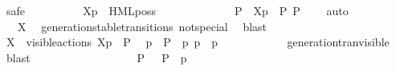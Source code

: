 \begin{isabellebody}
\ {\isacharparenleft}{\kern0pt}safe{\isacharparenright}{\kern0pt}\isanewline
\ \ \ \ \ \ \ \ \isamarkupfalse%
\ {\isacartoucheopen}{\isasymtheta}{\isacharbrackleft}{\kern0pt}X{\isacharbrackright}{\kern0pt}{\isacharparenleft}{\kern0pt}p{\isacharparenright}{\kern0pt}\ {\isasymTurnstile}\ HML{\isacharunderscore}{\kern0pt}poss\ {\isasymalpha}\ {\isasymsigma}{\isacharparenleft}{\kern0pt}{\isasymphi}{\isacharparenright}{\kern0pt}{\isacartoucheclose}\isanewline
\ \ \ \ \ \ \ \ \isamarkupfalse%
\ \isamarkupfalse%
\ P{\isacharprime}{\kern0pt}\ \ {\isacartoucheopen}{\isasymtheta}{\isacharbrackleft}{\kern0pt}X{\isacharbrackright}{\kern0pt}{\isacharparenleft}{\kern0pt}p{\isacharparenright}{\kern0pt}\ {\isasymlongmapsto}\isactrlsup {\isasymtheta}{\isasymalpha}\ P{\isacharprime}{\kern0pt}{\isacartoucheclose}\ {\isacartoucheopen}P{\isacharprime}{\kern0pt}\ {\isasymTurnstile}\ {\isasymsigma}{\isacharparenleft}{\kern0pt}{\isasymphi}{\isacharparenright}{\kern0pt}{\isacartoucheclose}\ \isamarkupfalse%
\ auto\isanewline
\ \ \ \ \ \ \ \ \isamarkupfalse%
\ {\isacartoucheopen}{\isasymalpha}\ {\isasymin}\ X{\isacartoucheclose}\ \isamarkupfalse%
\ generation{\isacharunderscore}{\kern0pt}stable{\isacharunderscore}{\kern0pt}transitions\ {\isasymalpha}{\isacharunderscore}{\kern0pt}not{\isacharunderscore}{\kern0pt}special\ \isamarkupfalse%
\ blast\isanewline
\ \ \ \ \ \ \ \ \isamarkupfalse%
\ {\isacartoucheopen}X\ {\isasymsubseteq}\ visible{\isacharunderscore}{\kern0pt}actions{\isacartoucheclose}\ {\isacartoucheopen}{\isasymtheta}{\isacharbrackleft}{\kern0pt}X{\isacharbrackright}{\kern0pt}{\isacharparenleft}{\kern0pt}p{\isacharparenright}{\kern0pt}\ {\isasymlongmapsto}\isactrlsup {\isasymtheta}{\isasymalpha}\ P{\isacharprime}{\kern0pt}{\isacartoucheclose}\ \isamarkupfalse%
\ p{\isacharprime}{\kern0pt}\ \ {\isacartoucheopen}P{\isacharprime}{\kern0pt}\ {\isacharequal}{\kern0pt}\ {\isasymtheta}{\isacharparenleft}{\kern0pt}p{\isacharprime}{\kern0pt}{\isacharparenright}{\kern0pt}{\isacartoucheclose}\ {\isacartoucheopen}p\ {\isasymlongmapsto}{\isasymalpha}\ p{\isacharprime}{\kern0pt}{\isacartoucheclose}\isanewline
\ \ \ \ \ \ \ \ \ \ \isamarkupfalse%
\ generation{\isacharunderscore}{\kern0pt}tran{\isacharunderscore}{\kern0pt}visible\ \isamarkupfalse%
\ blast\isanewline
\ \ \ \ \ \ \ \ \isanewline
\ \ \ \ \ \ \ \ \isamarkupfalse%
\ {\isacartoucheopen}P{\isacharprime}{\kern0pt}\ {\isasymTurnstile}\ {\isasymsigma}{\isacharparenleft}{\kern0pt}{\isasymphi}{\isacharparenright}{\kern0pt}{\isacartoucheclose}\ {\isacartoucheopen}P{\isacharprime}{\kern0pt}\ {\isacharequal}{\kern0pt}\ {\isasymtheta}{\isacharparenleft}{\kern0pt}p{\isacharprime}{\kern0pt}{\isacharparenright}{\kern0pt}{\isacartoucheclose}\ \isamarkupfalse%

\end{isabellebody}
